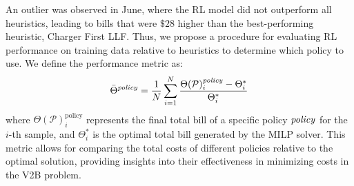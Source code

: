







% 


\iffalse
An outlier was observed in June, where the RL model did not outperform all heuristics, leading to bills that were $\$28$ higher than the best-performing heuristic, Charger First LLF. 
Thus, we propose a procedure for evaluating RL performance on training data relative to heuristics to determine which policy to use. We define the performance metric as:
\begin{equation}  
\bar{\Theta}^{\it policy} = \frac{1}{N} \sum_{i=1}^{N} \frac{\Theta(\mathcal{P})^{{\it policy}}_i - \Theta_i^*}{\Theta_i^*}
\label{eq:training_metrice}
\end{equation}
where $ \Theta(\mathcal{P})^{\text{policy}}_i $ represents the final total bill of a specific policy ${\it policy}$ for the $i$-th sample, and $\Theta_i^* $ is the optimal total bill generated by the MILP solver. This metric allows for comparing the total costs of different policies relative to the optimal solution, providing insights into their effectiveness in minimizing costs in the V2B problem.

